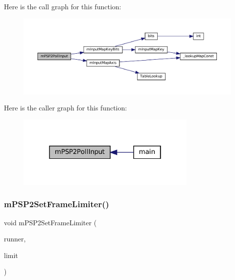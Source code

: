 Here is the call graph for this function\+:
\nopagebreak
\begin{figure}[H]
\begin{center}
\leavevmode
\includegraphics[width=350pt]{psp2-context_8c_a29b280976db23268da118020f60ce728_cgraph}
\end{center}
\end{figure}
Here is the caller graph for this function\+:
\nopagebreak
\begin{figure}[H]
\begin{center}
\leavevmode
\includegraphics[width=250pt]{psp2-context_8c_a29b280976db23268da118020f60ce728_icgraph}
\end{center}
\end{figure}
\mbox{\label{psp2-context_8c_a9a298ef5f14d11b2cf482a19a3a55d82}} 
\subsubsection{\texorpdfstring{m\+P\+S\+P2\+Set\+Frame\+Limiter()}{mPSP2SetFrameLimiter()}}
{\footnotesize\ttfamily void m\+P\+S\+P2\+Set\+Frame\+Limiter (\begin{DoxyParamCaption}\item[{struct \mbox{\hyperlink{structm_g_u_i_runner}{m\+G\+U\+I\+Runner}} $\ast$}]{runner,  }\item[{\mbox{\hyperlink{libretro_8h_a4a26dcae73fb7e1528214a068aca317e}{bool}}}]{limit }\end{DoxyParamCaption})}

